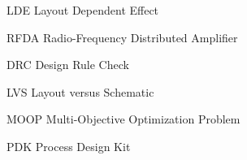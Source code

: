 
\begin{SymEntry}

\item[LDE]
Layout Dependent Effect 

\item[RFDA]
Radio-Frequency Distributed Amplifier

\item[DRC]
Design Rule Check

\item[LVS]
Layout versus Schematic

\item[MOOP]
Multi-Objective Optimization Problem

\item[PDK]
Process Design Kit


\end{SymEntry}
